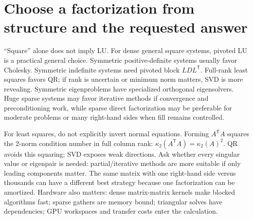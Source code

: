 \section{Choose a factorization from structure and the requested answer}\label{02-foundations-ii-ch038-choose-a-factorization-from-structure-and-the-requested-answer}

``Square'' alone does not imply LU. For dense general square systems, pivoted LU is a practical general choice. Symmetric positive-definite systems usually favor Cholesky. Symmetric indefinite systems need pivoted block \(LDL^\mathsf T\). Full-rank least squares favors QR; if rank is uncertain or minimum norm matters, SVD is more revealing. Symmetric eigenproblems have specialized orthogonal eigensolvers. Huge sparse systems may favor iterative methods if convergence and preconditioning work, while sparse direct factorization may be preferable for moderate problems or many right-hand sides when fill remains controlled.

For least squares, do not explicitly invert normal equations. Forming \(A^\mathsf TA\) squares the 2-norm condition number in full column rank: \(\kappa_2(A^\mathsf TA)=\kappa_2(A)^2\). QR avoids this squaring; SVD exposes weak directions. Ask whether every singular value or eigenpair is needed: partial/iterative methods are more suitable if only leading components matter. The same matrix with one right-hand side versus thousands can have a different best strategy because one factorization can be amortized. Hardware also matters: dense matrix-matrix kernels make blocked algorithms fast; sparse gathers are memory bound; triangular solves have dependencies; GPU workspaces and transfer costs enter the calculation.

